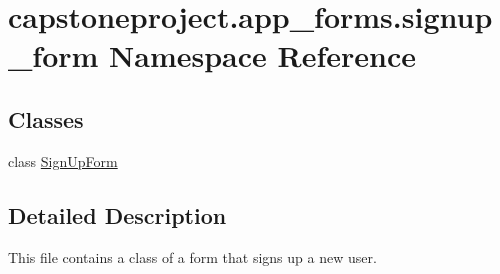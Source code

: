 \hypertarget{namespacecapstoneproject_1_1app__forms_1_1signup__form}{}\section{capstoneproject.\+app\+\_\+forms.\+signup\+\_\+form Namespace Reference}
\label{namespacecapstoneproject_1_1app__forms_1_1signup__form}
\subsection*{Classes}
\begin{DoxyCompactItemize}
\item 
class \mbox{\hyperlink{classcapstoneproject_1_1app__forms_1_1signup__form_1_1_sign_up_form}{Sign\+Up\+Form}}
\end{DoxyCompactItemize}


\subsection{Detailed Description}
\begin{DoxyVerb}This file contains a class of a form that signs up a new user.
\end{DoxyVerb}
 